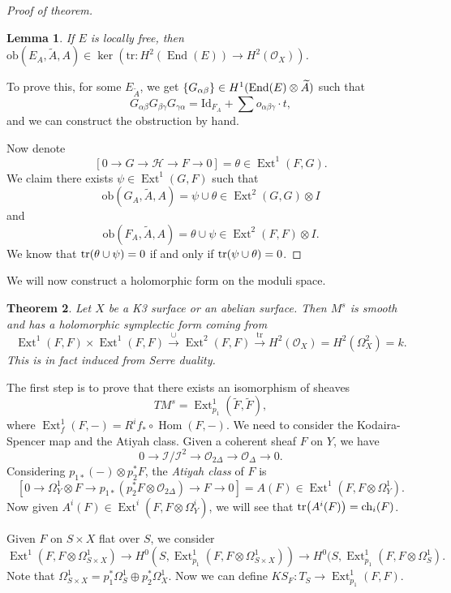 \documentclass[leqno, openany]{memoir}
\newtheorem{thm}{Theorem}[section]
\newtheorem{lem}[thm]{Lemma}
\theoremstyle{definition}
\theoremstyle{remark}
\theoremstyle{plain}
\theoremstyle{definition}
\theoremstyle{remark}
\newcommand{\mc}[1]{\mathcal{#1}}
\newcommand{\mr}[1]{\mathrm{#1}}
\newcommand{\wt}[1]{\widetilde{#1}}
\DeclareMathOperator{\Hom}{Hom}
\DeclareMathOperator{\End}{End}
\DeclareMathOperator{\Ext}{Ext}
\begin{document}
\begin{proof}[Proof of theorem]
\begin{lem}
    If $E$ is locally free, then $\mr{ob}(E_A, \wt{A}, A) \in \ker(\mr{tr} \colon H^2(\End(E)) \to H^2(\mc{O}_X))$.
\end{lem}

To prove this, for some $E_{\wt{A}}$, we get $\qty{G_{\alpha\beta}} \in H^1(\End(E) \otimes \wt{A})$ such that
\[ G_{\alpha\beta} G_{\beta \gamma} G_{\gamma\alpha} = \mr{Id}_{F_A} + \sum o_{\alpha\beta\gamma} \cdot t, \]
and we can construct the obstruction by hand.

Now denote
\[ [0 \to G \to \mc{H} \to F \to 0] = \theta \in \Ext^1(F, G). \]
We claim there exists $\psi \in \Ext^1(G, F)$ such that 
\[ \mr{ob}(G_A, \wt{A}, A) = \psi \cup \theta \in \Ext^2(G, G) \otimes I \]
and 
\[ \mr{ob}(F_A, \wt{A}, A) = \theta \cup \psi \in \Ext^2(F, F) \otimes I. \]
We know that $\tr(\theta \cup \psi) =0$ if and only if $\tr(\psi \cup \theta) = 0$.
\end{proof}

We will now construct a holomorphic form on the moduli space.
\begin{thm}
    Let $X$ be a K3 surface or an abelian surface. Then $M^s$ is smooth and has a holomorphic symplectic form coming from
    \[ \Ext^1(F, F) \times \Ext^1(F, F) \xrightarrow{\cup} \Ext^2(F, F) \xrightarrow{\mr{tr}} H^2(\mc{O}_X) = H^2(\Omega^2_X) = k. \]
    This is in fact induced from Serre duality.
\end{thm}

The first step is to prove that there exists an isomorphism of sheaves
\[ TM^s = \Ext^1_{p_1}(\wt{F}, \wt{F}), \]
where $\Ext^1_f(F, -) = R^i f_* \circ \Hom(F, -)$. We need to consider the Kodaira-Spencer map and the Atiyah class. Given a coherent sheaf $F$ on $Y$, we have
\[ 0 \to \mc{I} / \mc{I}^2 \to \mc{O}_{2 \Delta} \to \mc{O}_{\Delta} \to 0. \]
Considering $p_{1*}(-) \otimes p_2^* F$, the \textit{Atiyah class} of $F$ is
\[ [0 \to \Omega^1_Y \otimes F \to p_{1*}(p_2^*F \otimes \mc{O}_{2 \Delta}) \to F \to 0] = A(F) \in \Ext^1(F, F \otimes \Omega^1_Y). \]
Now given $A^i(F) \in \Ext^i(F, F \otimes \Omega_Y^i)$, we will see that $\tr(A^i(F)) = \mr{ch}_i(F)$.

Given $F$ on $S \times X$ flat over $S$, we consider
\[ \Ext^1(F, F \otimes \Omega^1_{S \times X}) \to H^0(S, \Ext_{p_1}^1(F, F \otimes \Omega^1_{S \times X})) \to H^0(S, \Ext^1_{p_1}(F, F \otimes \Omega^1_S). \]
Note that $\Omega^1_{S \times X} = p_1^* \Omega^1_S \oplus p_2^* \Omega^1_X$. Now we can define $KS_F \colon T_S \to \Ext^1_{p_1}(F, F)$.
\end{document}
